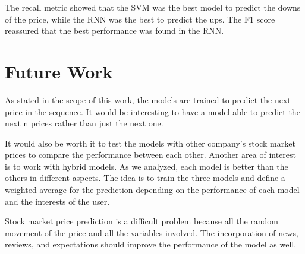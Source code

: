 The recall metric showed that the SVM was the best model to predict the downs of the price, while the RNN was the best to predict the ups. The F1 score reassured that the best performance was found in the RNN.



\section{Future Work}

As stated in the scope of this work, the models are trained to predict the next price in the sequence. It would be interesting to have a model able to predict the next n prices rather than just the next one.

It would also be worth it to test the models with other company's stock market prices to compare the performance between each other. Another area of interest is to work with hybrid models. As we analyzed, each model is better than the others in different aspects. The idea is to train the three models and define a weighted average for the prediction depending on the performance of each model and the interests of the user.

Stock market price prediction is a difficult problem because all the random movement of the price and all the variables involved. The incorporation of news, reviews, and expectations should improve the performance of the model as well. 

